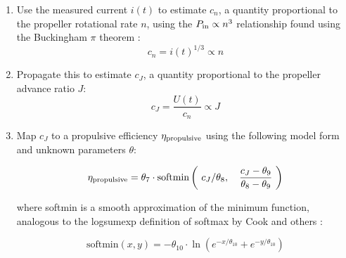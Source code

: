 \documentclass[conf]{new-aiaa}
\begin{document}
    \begin{enumerate}
        \item Use the measured current $i(t)$ to estimate $c_n$, a quantity proportional to the propeller rotational rate $n$, using the $P_{\rm in}\propto n^3$ relationship found using the Buckingham $\pi$ theorem \cite{unified_propellers}:
        \begin{equation*}
            c_n = i(t)^{1/3} \propto n
        \end{equation*}
        \item Propagate this to estimate $c_J$, a quantity proportional to the propeller advance ratio $J$:
        \begin{equation*}
            c_J = \frac{U(t)}{c_n} \propto J
        \end{equation*}
        \item Map $c_J$ to a propulsive efficiency $\eta_{\rm propulsive}$ using the following model form and unknown parameters $\theta$:

        \begin{equation}
            \eta_{\rm propulsive} =
            \theta_7 \cdot \text{softmin} \left(\
            c_J / \theta_8,\quad
            \frac{c_J - \theta_9}{\theta_8 - \theta_9}\
            \right)
        \end{equation}

        \noindent where softmin is a smooth approximation of the minimum function, analogous to the logsumexp definition of softmax by Cook and others \cite{cook_basic_2011}:

        \begin{equation*}
            \text{softmin}(x, y) = -\theta_{10} \cdot \ln \left( e^{-x / \theta_{10}} + e^{-y / \theta_{10}} \right)
        \end{equation*}


\end{enumerate}
\end{document}
